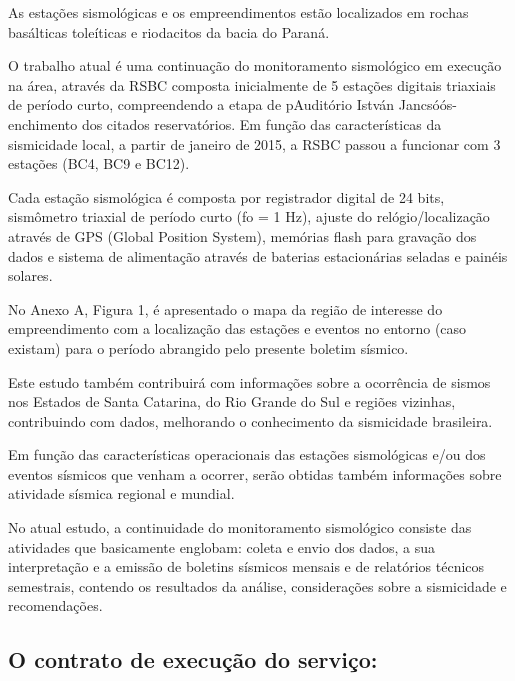 \par{As estações sismológicas e os empreendimentos estão localizados em rochas basálticas toleíticas e riodacitos da bacia do Paraná.}\\
\par{O trabalho atual é uma continuação do monitoramento sismológico em execução na área, através da RSBC composta inicialmente de 5 estações digitais triaxiais de período curto, compreendendo a etapa de pAuditório István Jancsóós-enchimento dos citados reservatórios. Em função das características da sismicidade local, a partir de janeiro de 2015, a RSBC passou a funcionar com 3 estações (BC4, BC9 e BC12).}\\
\par{Cada estação sismológica é composta por registrador digital de 24 bits, sismômetro triaxial de período curto (fo = 1 Hz), ajuste do relógio/localização através de GPS (Global Position System), memórias flash para gravação dos dados e sistema de alimentação através de baterias estacionárias seladas e painéis solares.}\\
\par{No Anexo A, Figura 1, é apresentado o mapa da região de interesse do empreendimento com a localização das estações e eventos no entorno (caso existam) para o período abrangido pelo presente boletim sísmico.}\\
\par{Este estudo também contribuirá com informações sobre a ocorrência de sismos nos Estados de Santa Catarina, do Rio Grande do Sul e regiões vizinhas, contribuindo com dados, melhorando o conhecimento da sismicidade brasileira.}\\
\par{Em função das características operacionais das estações sismológicas e/ou dos eventos sísmicos que venham a ocorrer, serão obtidas também informações sobre atividade sísmica regional e mundial.}\\
\par{No atual estudo, a continuidade do monitoramento sismológico consiste das atividades que basicamente englobam: coleta e envio dos dados, a sua interpretação e a emissão de boletins sísmicos mensais e de relatórios técnicos semestrais, contendo os resultados da análise, considerações sobre a sismicidade e recomendações.}\\

\subsection{O contrato de execução do serviço:}

